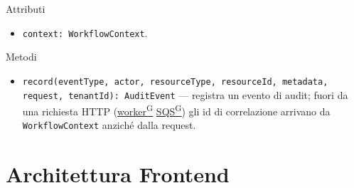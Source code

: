 \documentclass[a4paper,12pt]{article}
\providecommand{\glslink}[2]{\href{https://alittlebyte-19.github.io/Documentazione/glossario.html\#gls-#1}{\underline{#2}\textsuperscript{\scriptsize G}}}
\begin{document}
\begin{sloppypar}
Attributi
\begin{itemize}\raggedright
    \item \texttt{context: WorkflowContext}.
\end{itemize}

Metodi
\begin{itemize}\raggedright
    \item \texttt{record(eventType, actor, resourceType, resourceId, metadata, request, tenantId): AuditEvent} --- registra un evento di audit; fuori da una richiesta HTTP (\glslink{worker}{worker} \glslink{sqs-simple-queue-service}{SQS}) gli id di correlazione arrivano da \texttt{WorkflowContext} anziché dalla request.
\end{itemize}
\end{sloppypar}

\section{Architettura Frontend}
\end{document}
